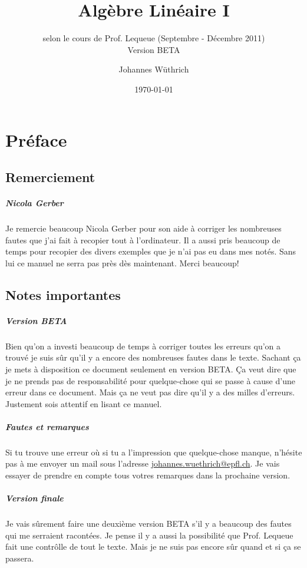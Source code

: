 \documentclass[10pt,a4paper]{scrreprt}
\title{Algèbre Linéaire I}
\subtitle{selon le cours de Prof. Lequeue (Septembre - Décembre 2011) \\ Version BETA}
\author{Johannes Wüthrich}
\date{\today}
\begin{document}
\maketitle

\setcounter{chapter}{-1}

\chapter{Préface}
%
\section{Remerciement}
%
\paragraph{Nicola Gerber} Je remercie beaucoup Nicola Gerber pour son aide à corriger les nombreuses fautes que j'ai fait à recopier tout à l'ordinateur. Il a aussi pris beaucoup de temps pour recopier des divers exemples que je n'ai pas eu dans mes notés. Sans lui ce manuel ne serra pas près dès maintenant. Merci beaucoup!

%
\section{Notes importantes}
%
\paragraph{Version BETA} Bien qu'on a investi beaucoup de temps à corriger toutes les erreurs qu'on a trouvé je suis sûr qu'il y a encore des nombreuses fautes dans le texte. Sachant ça je mets à disposition ce document seulement en version BETA. Ça veut dire que je ne prends pas de responsabilité pour quelque-chose qui se passe à cause d'une erreur dans ce document. Mais ça ne veut pas dire qu'il y a des milles d'erreurs. Justement sois attentif en lisant ce manuel.

\paragraph{Fautes et remarques} Si tu trouve une erreur où si tu a l'impression que quelque-chose manque, n'hésite pas à me envoyer un mail sous l'adresse \href{mailto:johannes.wuethrich@epfl.ch}{johannes.wuethrich@epfl.ch}. Je vais essayer de prendre en compte tous votres remarques dans la prochaine version.

\paragraph{Version finale} Je vais sûrement faire une deuxième version BETA s'il y a beaucoup des fautes qui me serraient racontées. Je pense il y a aussi la possibilité que Prof. Lequeue fait une contrôlle de tout le texte. Mais je ne suis pas encore sûr quand et si ça se passera. 

\tableofcontents













\end{document}
